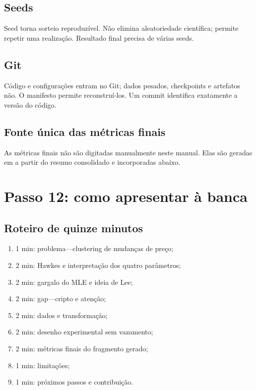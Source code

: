\documentclass[12pt,a4paper,openany]{report}
\begin{document}
\section{Seeds}

Seed torna sorteio reproduzível. Não elimina aleatoriedade científica; permite repetir
uma realização. Resultado final precisa de várias seeds.

\section{Git}

Código e configurações entram no Git; dados pesados, checkpoints e artefatos não.
O manifesto permite reconstruí-los. Um commit identifica exatamente a versão do código.

\section{Fonte única das métricas finais}

As métricas finais não são digitadas manualmente neste manual. Elas são geradas em
 a partir do resumo consolidado e incorporadas
abaixo.



\chapter{Passo 12: como apresentar à banca}

\section{Roteiro de quinze minutos}

\begin{enumerate}
  \item 1 min: problema---clustering de mudanças de preço;
  \item 2 min: Hawkes e interpretação dos quatro parâmetros;
  \item 2 min: gargalo do MLE e ideia de Lee;
  \item 2 min: gap---cripto e atenção;
  \item 2 min: dados e transformação;
  \item 2 min: desenho experimental sem vazamento;
  \item 2 min: métricas finais do fragmento gerado;
  \item 1 min: limitações;
  \item 1 min: próximos passos e contribuição.
\end{enumerate}
\end{document}
